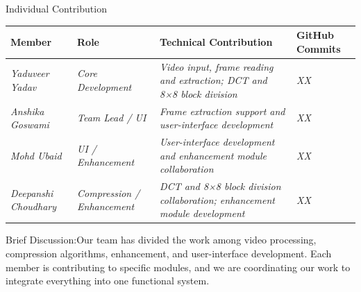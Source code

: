 \documentclass[aspectratio=169,11pt]{beamer}
\newcommand{\smallnote}[1]{%
\vspace{0.08cm}
{\scriptsize\color{GEUGrey}#1}
}
\newcommand{\placeholder}[1]{%
\textit{\color{GEUGrey}#1}
}
\begin{document}
\begin{frame}{Individual Contribution}

\scriptsize

\begin{center}

\renewcommand{\arraystretch}{1.05}

\begin{tabularx}{.96\textwidth}
{@{}p{2.0cm}p{2.0cm}X p{1.6cm}@{}}

\toprule
Member &
Role &
Technical Contribution &
GitHub Commits\\
\midrule

\placeholder{Yaduveer Yadav} &
\placeholder{Core Development} &
\placeholder{Video input, frame reading and extraction; DCT and 8×8 block division} &
\placeholder{XX}\\

\placeholder{Anshika Goswami} &
\placeholder{Team Lead / UI} &
\placeholder{Frame extraction support and user-interface development} &
\placeholder{XX}\\

\placeholder{Mohd Ubaid} &
\placeholder{UI / Enhancement} &
\placeholder{User-interface development and enhancement module collaboration} &
\placeholder{XX}\\

\placeholder{Deepanshi Choudhary} &
\placeholder{Compression / Enhancement} &
\placeholder{DCT and 8×8 block division collaboration; enhancement module development} &
\placeholder{XX}\\

\bottomrule

\end{tabularx}

\end{center}

\vspace{0.5mm}


\smallnote{
Brief Discussion:Our team has divided the work among video processing, compression algorithms, enhancement, and user-interface development. Each member is contributing to specific modules, and we are coordinating our work to integrate everything into one functional system.
}

\end{frame}
\end{document}
